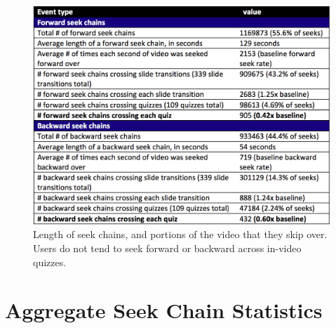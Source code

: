 \documentclass{sigchi}
\begin{document}

\begin{figure}
\includegraphics[width=1.0\columnwidth]{table-of-seeks}
\caption{Length of seek chains, and portions of the video that they skip over. Users do not tend to seek forward or backward across in-video quizzes.}
\label{fig:table-of-seeks}
\end{figure}

\section{Aggregate Seek Chain Statistics}
\end{document}
